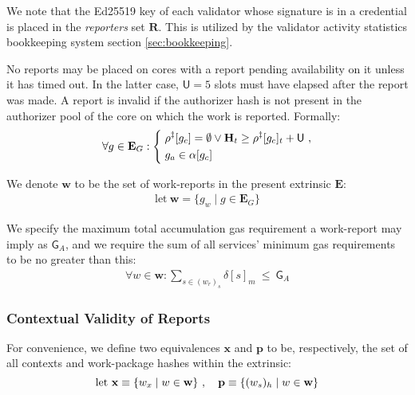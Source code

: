 We note that the Ed25519 key of each validator whose signature is in a credential is placed in the \emph{reporters} set $\mathbf{R}$. This is utilized by the validator activity statistics bookkeeping system section \ref{sec:bookkeeping}.

No reports may be placed on cores with a report pending availability on it unless it has timed out. In the latter case, $\mathsf{U} = 5$ slots must have elapsed after the report was made. A report is invalid if the authorizer hash is not present in the authorizer pool of the core on which the work is reported. Formally:
\begin{equation}\label{eq:reportcoresareunusedortimedout}
  \forall g \in \mathbf{E}_G :\left\{\;\begin{aligned}
    &\rho^\ddagger[g_c] = \none \vee \mathbf{H}_t \ge \rho^\ddagger[g_c]_t + \mathsf{U}\ , \\
    &g_a \in \alpha[g_c]
  \end{aligned}\right.
\end{equation}

We denote $\mathbf{w}$ to be the set of work-reports in the present extrinsic $\mathbf{E}$:
\begin{align}
  \text{let}\ \mathbf{w} = \{ g_w \mid g \in \mathbf{E}_G \}
\end{align}

We specify the maximum total accumulation gas requirement a work-report may imply as $\mathsf{G}_A$, and we require the sum of all services' minimum gas requirements to be no greater than this:
\begin{align}
  \forall w \in \mathbf{w}: \sum_{s \in (w_r)_s}{\delta[s]_m}\ \le\ \mathsf{G}_A
\end{align}












\subsubsection{Contextual Validity of Reports}\label{sec:contextualvalidity}

For convenience, we define two equivalences $\mathbf{x}$ and $\mathbf{p}$ to be, respectively, the set of all contexts and work-package hashes within the extrinsic:
\begin{equation}
    \text{let } \mathbf{x} \equiv \{ w_x \mid w \in \mathbf{w} \}\ ,\quad
    \mathbf{p} \equiv \{ (w_s)_h \mid w \in \mathbf{w} \}
\end{equation}

